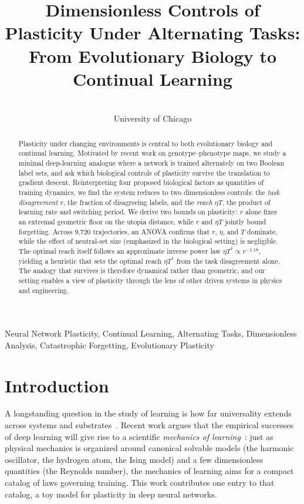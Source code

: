 \documentclass[pmlr]{jmlr} %
\title[Dimensionless Controls of Plasticity]{Dimensionless Controls of Plasticity Under Alternating Tasks: From Evolutionary Biology to Continual Learning}
\author{\Name{Owen Skriloff} \Email{oskriloff@uchicago.edu} \\
   \addr University of Chicago}
\begin{document}
\maketitle

\begin{abstract}
Plasticity under changing environments is central to both evolutionary biology and continual learning. Motivated by recent work on genotype--phenotype maps, we study a minimal deep-learning analogue where a network is trained alternately on two Boolean label sets, and ask which biological controls of plasticity survive the translation to gradient descent. Reinterpreting four proposed biological factors as quantities of training dynamics, we find the system reduces to two dimensionless controls: the \emph{task disagreement} $r$, the fraction of disagreeing labels, and the \emph{reach} $\eta T$, the product of learning rate and switching period. We derive two bounds on plasticity: $r$ alone fixes an extremal geometric floor on the utopia distance, while $r$ and $\eta T$ jointly bound forgetting. Across 9{,}720 trajectories, an ANOVA confirms that $r$, $\eta$, and $T$ dominate, while the effect of neutral-set size (emphasized in the biological setting) is negligible. The optimal reach itself follows an approximate inverse power law $\eta T^{*}\propto r^{-1.18}$, yielding a heuristic that sets the optimal reach $\eta T^*$ from the task disagreement alone. The analogy that survives is therefore dynamical rather than geometric, and our setting enables a view of plasticity through the lens of other driven systems in physics and engineering.
\end{abstract}
\begin{keywords}
Neural Network Plasticity, Continual Learning, Alternating Tasks, Dimensionless Analysis, Catastrophic Forgetting, Evolutionary Plasticity
\end{keywords}


\section{Introduction}

A longstanding question in the study of learning is how far universality extends across systems and substrates~\citep{learningmech26, repsalign24, platonic24, diffconsistency24, spinglass23}. Recent work argues that the empirical successes of deep learning will give rise to a scientific \emph{mechanics of learning}~\citep{learningmech26}: just as physical mechanics is organized around canonical solvable models (the harmonic oscillator, the hydrogen atom, the Ising model) and a few dimensionless quantities (the Reynolds number), the mechanics of learning aims for a compact catalog of laws governing training. This work contributes one entry to that catalog, a toy model for plasticity in deep neural networks.
\end{document}
